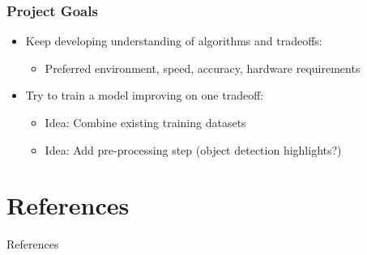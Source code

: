 \documentclass{beamer}
\begin{document}
\begin{frame}
\frametitle{Project Goals}
\begin{itemize}
    \item Keep developing understanding of algorithms and tradeoffs: \pause
    \begin{itemize}
        \item Preferred environment, speed, accuracy, hardware requirements
    \end{itemize} \pause
    \item Try to train a model improving on one tradeoff: \pause
    \begin{itemize}
        \item Idea: Combine existing training datasets
        \item Idea: Add pre-processing step (object detection highlights?)
    \end{itemize}
\end{itemize}
\end{frame}

\section{References}
\begin{frame}{References}
\scriptsize
\nocite{*}


\end{frame}
\end{document}
